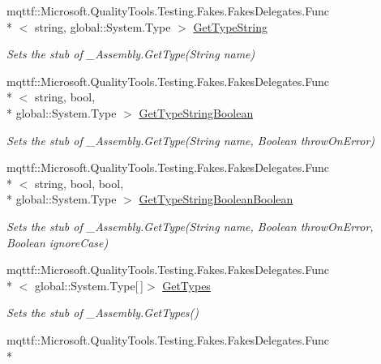 \begin{DoxyCompactItemize}
mqttf\-::\-Microsoft.\-Quality\-Tools.\-Testing.\-Fakes.\-Fakes\-Delegates.\-Func\\*
$<$ string, global\-::\-System.\-Type $>$ \hyperlink{class_system_1_1_runtime_1_1_interop_services_1_1_fakes_1_1_stub___assembly_a28217c8e85d6a741b5b2668f18aabe5a}{Get\-Type\-String}
\begin{DoxyCompactList}\small\item\em Sets the stub of \-\_\-\-Assembly.\-Get\-Type(\-String name)\end{DoxyCompactList}\item 
mqttf\-::\-Microsoft.\-Quality\-Tools.\-Testing.\-Fakes.\-Fakes\-Delegates.\-Func\\*
$<$ string, bool, \\*
global\-::\-System.\-Type $>$ \hyperlink{class_system_1_1_runtime_1_1_interop_services_1_1_fakes_1_1_stub___assembly_a0a7aa802dc1be1b4c5bf8199dd32b2f5}{Get\-Type\-String\-Boolean}
\begin{DoxyCompactList}\small\item\em Sets the stub of \-\_\-\-Assembly.\-Get\-Type(\-String name, Boolean throw\-On\-Error)\end{DoxyCompactList}\item 
mqttf\-::\-Microsoft.\-Quality\-Tools.\-Testing.\-Fakes.\-Fakes\-Delegates.\-Func\\*
$<$ string, bool, bool, \\*
global\-::\-System.\-Type $>$ \hyperlink{class_system_1_1_runtime_1_1_interop_services_1_1_fakes_1_1_stub___assembly_a8e1594e9371401702e7c11342ad71bd2}{Get\-Type\-String\-Boolean\-Boolean}
\begin{DoxyCompactList}\small\item\em Sets the stub of \-\_\-\-Assembly.\-Get\-Type(\-String name, Boolean throw\-On\-Error, Boolean ignore\-Case)\end{DoxyCompactList}\item 
mqttf\-::\-Microsoft.\-Quality\-Tools.\-Testing.\-Fakes.\-Fakes\-Delegates.\-Func\\*
$<$ global\-::\-System.\-Type\mbox{[}$\,$\mbox{]}$>$ \hyperlink{class_system_1_1_runtime_1_1_interop_services_1_1_fakes_1_1_stub___assembly_a384fbaf2f94c65c3b11574240e773e41}{Get\-Types}
\begin{DoxyCompactList}\small\item\em Sets the stub of \-\_\-\-Assembly.\-Get\-Types()\end{DoxyCompactList}\item 
mqttf\-::\-Microsoft.\-Quality\-Tools.\-Testing.\-Fakes.\-Fakes\-Delegates.\-Func\\*

\end{DoxyCompactItemize}
